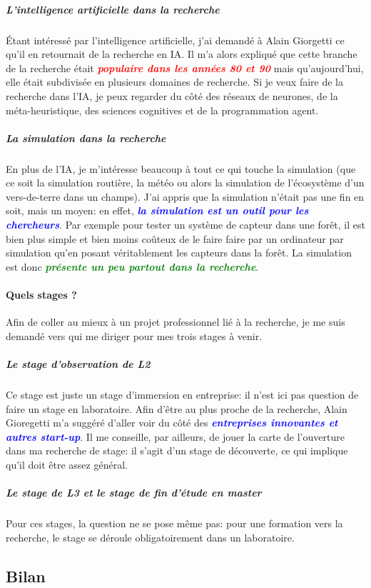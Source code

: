 \documentclass[a4paper,12pt, draft]{report}
\newcommand{\goodPoint}[1]{\textcolor{green}{\textbf{\textit{#1}}}}
\newcommand{\badPoint}[1]{\textcolor{red}{\textbf{\textit{#1}}}}
\newcommand{\importantPoint}[1]{\textcolor{blue}{\textbf{\textit{#1}}}}
\begin{document}
\subparagraph{L'intelligence artificielle dans la recherche}
Étant intéressé par l'intelligence artificielle, j'ai demandé à Alain Giorgetti ce qu'il en retournait de la recherche en IA. Il m'a alors expliqué que cette branche de la recherche était \badPoint{populaire dans les années 80 et 90} mais qu'aujourd'hui,  elle était subdivisée en plusieurs domaines de recherche. Si je veux faire de la recherche dans l'IA, je peux regarder du côté des réseaux de neurones, de la méta-heuristique, des sciences cognitives et de la programmation agent. 

\subparagraph{La simulation dans la recherche}
En plus de l'IA, je m'intéresse beaucoup à tout ce qui touche la simulation (que ce soit la simulation routière, la météo ou alors la simulation de l'écosystème d'un vers-de-terre dans un champs). J'ai appris que la simulation n'était pas une fin en soit, mais un moyen: en effet, \importantPoint{la simulation est un outil pour les chercheurs}. Par exemple pour tester un système de capteur dans une forêt, il est bien plus simple et bien moins coûteux de le faire faire par un ordinateur par simulation qu'en posant véritablement les capteurs dans la forêt. La simulation est donc \goodPoint{présente un peu partout dans la recherche}.

\paragraph{Quels stages ?}
Afin de coller au mieux à un projet professionnel lié à la recherche, je me suis demandé vers qui me diriger pour mes trois stages à venir.
\subparagraph{Le stage d'observation de L2}
Ce stage est juste un stage d'immersion en entreprise: il n'est ici pas question de faire un stage en laboratoire. Afin d'être au plus proche de la recherche, Alain Gioregetti m'a suggéré d'aller voir du côté des \importantPoint{entreprises innovantes et autres start-up}. Il me conseille, par ailleurs, de jouer la carte de l'ouverture dans ma recherche de stage: il s'agit d'un stage de découverte, ce qui implique qu'il doit être assez général.
\subparagraph{Le stage de L3 et le stage de fin d'étude en master}
Pour ces stages, la question ne se pose même pas: pour une formation vers la recherche, le stage se déroule obligatoirement dans un laboratoire.

\subsection{Bilan}
\end{document}
